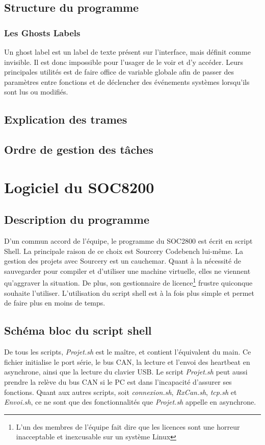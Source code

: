 \documentclass[10pt,a4paper,final]{article}
\begin{document}
\begin{spacing}{1.5}

\subsection{Structure du programme}

\subsubsection{Les Ghosts Labels}
Un ghost label est un label de texte présent sur l'interface, mais définit comme invisible. Il est donc impossible pour l'usager de le voir et d'y accéder. Leurs principales utilités est de faire office de variable globale afin de passer des paramètres entre fonctions et de déclencher des événements systèmes lorsqu'ils sont lus ou modifiés.
\subsection{Explication des trames}

\subsection{Ordre de gestion des tâches}





\pagebreak
\section{Logiciel du SOC8200}
\subsection{Description du programme}
D'un commun accord de l'équipe, le programme du SOC2800 est écrit en script Shell. La principale raison de ce choix est Sourcery Codebench lui-même. La gestion des projets avec Sourcery est un cauchemar. Quant à la nécessité de sauvegarder pour compiler et d'utiliser une machine virtuelle, elles ne viennent qu'aggraver la situation. De plus, son gestionnaire de licence\footnote{L'un des membres de l'équipe fait dire que les licences sont une horreur inacceptable et inexcusable sur un système Linux} frustre quiconque souhaite l'utiliser. L'utilisation du script shell est à la fois plus simple et permet de faire plus en moins de temps.

\subsection{Schéma bloc du script shell}
De tous les scripts, \textit{Projet.sh} est le maître, et contient l'équivalent du main. Ce fichier initialise le port série, le bus CAN, la lecture et l'envoi des heartbeat en asynchrone, ainsi que la lecture du clavier USB. Le script \textit{Projet.sh} peut aussi prendre la relève du bus CAN si le PC est dans l'incapacité d'assurer ses fonctions. Quant aux autres scripts, soit \textit{connexion.sh}, \textit{RxCan.sh}, \textit{tcp.sh} et \textit{Envoi.sh}, ce ne sont que des fonctionnalités que \textit{Projet.sh} appelle en asynchrone.


\end{spacing}
\end{document}
